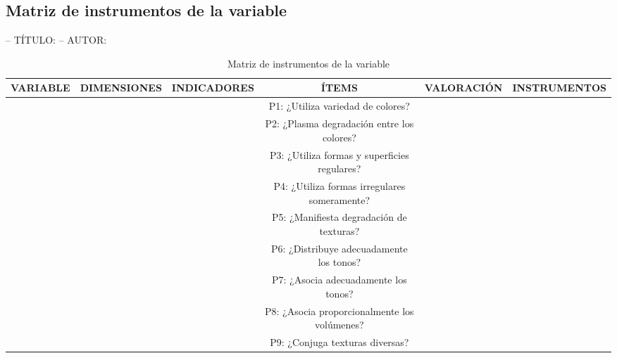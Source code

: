 \documentclass[12pt,a4paper]{article}
\newcommand{\ce}{\centering}
\newcommand\Tstrut{\rule{0pt}{2.35ex}}
\begin{document}
\begin{landscape}
	\subsection{Matriz de instrumentos de la variable \MakeTextLowercase{\variabled} \label{1www}}
	
	\lugar -- TÍTULO: \titulo -- AUTOR: \autor
	\begin{table}[ht!]\caption{Matriz de instrumentos de la variable \MakeTextLowercase{\variabled}}
			\centering \scriptsize\renewcommand\tabcolsep{0.1cm}\renewcommand{}
			\begin{tabular}{cccccc} 			\hline\ce\bf VARIABLE&\ce\bf DIMENSIONES &\ce\bf INDICADORES&\ce\bf ÍTEMS &\ce\bf VALORACIÓN& \bf INSTRUMENTOS \Tstrut 			\\
				\hline 		
				\multirow{20}{*}{\rotatebox[origin=c]{90}{\variabled}}& 			
				\multirow{5}{*}{\dimd} 			& 
				\multirow{2}{*}{\fb} 			&
				P1: ¿Utiliza variedad de colores?& 			
				&
				\\	
				&&& 
				P2: ¿Plasma degradación entre los colores? &\\ 			&&
				 			&
				P3: ¿Utiliza formas y superficies regulares?\\	
				&&& 
				P4: ¿Utiliza formas irregulares someramente?      &\\ 	&&
				 			&
				P5: ¿Manifiesta degradación de texturas? \\ 			&
				 			& 
				 			&
				P6: ¿Distribuye adecuadamente los tonos?\\	
				&&& 
				P7: ¿Asocia adecuadamente los tonos?       &\\ 			&&
				 			&
				P8: ¿Asocia proporcionalmente los volúmenes?\\ 		&&
				 			&
				P9: ¿Conjuga texturas diversas?\\	

\end{tabular}
\end{table}
\end{landscape}
\end{document}
